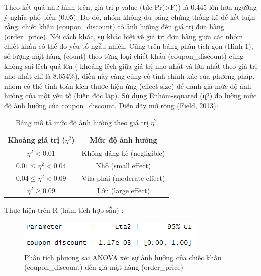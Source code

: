 Theo kết quả như hình trên, giá trị p-value (tức Pr(>F)) là 0.445 lớn hơn ngưỡng ý nghĩa phổ biến (0.05). Do đó, nhóm không đủ bằng chứng thống kê để kết luận rằng, chiết khấu (coupon\_discount) có ảnh hưởng đến giá trị đơn hàng (order\_price). Nói cách khác, sự khác biệt về giá trị đơn hàng giữa các nhóm chiết khấu có thể do yếu tố ngẫu nhiên.
Cũng trên bảng phân tích gọn (Hình 1),  số lượng mặt hàng (count) theo từng loại chiết khấu (coupon\_discount) cũng  không sai lệch quá lớn ( khoảng lệch giữa giá trị nhỏ nhất và lớn nhất theo giá trị nhỏ nhất chỉ là 8.654\%), điều này càng cũng cố tính chính xác của phương pháp.
nhóm có thể tính toán kích thước hiệu ứng (effect size) để đánh giá mức độ ảnh hưởng của một yếu tố (biến độc lập). Sử dụng Enhóm-squared (ɳ2) đo lường mức độ ảnh hưởng của coupon\_discount. Diễn dãy mở rộng (Field, 2013):

\begin{table}[ht]
    \centering
    \begin{tabular}{|c|c|}
    \hline
    \textbf{Khoảng giá trị ($\eta^2$)} & \textbf{Mức độ ảnh hưởng} \\ 
    \hline
    $\eta^2 < 0.01$ & Không đáng kể (negligible) \\ 
    \hline
    $0.01 \leq \eta^2 < 0.04$ & Nhỏ (small effect) \\ 
    \hline
    $0.04 \leq \eta^2 < 0.09$ & Vừa phải (moderate effect) \\ 
    \hline
    $\eta^2 \geq 0.09$ & Lớn (large effect) \\ 
    \hline
    \end{tabular}
    \caption{Bảng mô tả mức độ ảnh hưởng theo giá trị $\eta^2$}
    \label{table:effect_size}
\end{table}

Thực hiện trên R (hàm tích hợp sẵn) :
\begin{figure}[!htbp]
    \centering
    \includegraphics[width=0.6\linewidth]{graphics/5.3.3.png}
    \caption{Phân tích phương sai ANOVA xét sự ảnh hưởng của chiếc khấu (coupon\_discount) đến giá mặt hàng (order\_price)}
\end{figure}
